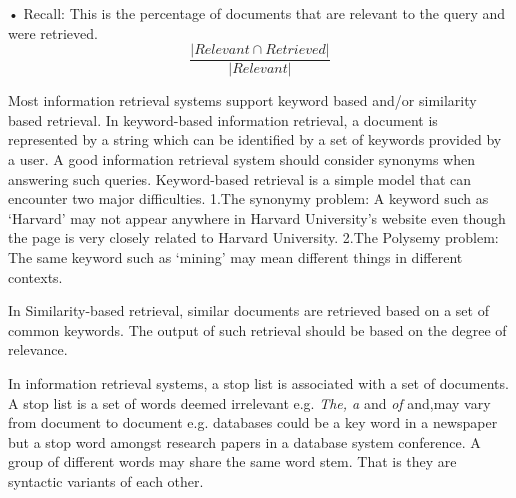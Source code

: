 \documentclass{article}
\begin{document}
           
•	Recall: This is the percentage of documents that are relevant to the query and were retrieved. \begin{equation}
\frac{|{Relevant}\cap{Retrieved}|}{|Relevant|}\end{equation}  
           
Most information retrieval systems support keyword based and/or similarity based retrieval. In keyword-based information retrieval, a document is represented by a string which can be identified by a set of keywords provided by a user. A good information retrieval system should consider synonyms when answering such queries. Keyword-based retrieval is a simple model that can encounter two major difficulties.\newline
1.The synonymy problem: A keyword such as ‘Harvard’ may not appear anywhere in  Harvard University’s website even though the page is very closely related to Harvard University. \newline
2.The Polysemy problem: The same keyword such as ‘mining’ may mean different things in different contexts.

In Similarity-based retrieval, similar documents are retrieved based on a set of common keywords. The output of such retrieval should be based on the degree of relevance.

In information retrieval systems, a stop list is associated with a set of documents. A stop list is a set of words deemed irrelevant e.g. \textit{The, a} and\textit{ of} and,may vary from document to document e.g. {databases} could be a key word in a newspaper but a stop word amongst research papers in a database system conference. A group of different words may share the same word stem. That is they are syntactic variants of each other.
\end{document}
